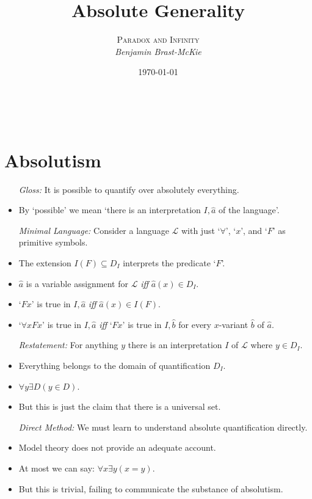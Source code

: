\documentclass[a4paper, 11pt]{article} %
\title{\textbf{Absolute Generality}} %
\author{\textsc{Paradox and Infinity}\\ \em Benjamin Brast-McKie} %
\date{\today} %
\makeatletter
\newcommand{\corner}[1]{\ulcorner#1\urcorner} %
\renewcommand{\L}{\mathcal{L}}
\renewcommand{\maketitle}{ %
\begin{flushright} %
{\LARGE\@title} %

\vspace{10pt} %

{\@author} %
\\\@date %

\vspace{-20pt} %
\end{flushright}
}
\makeatother
\begin{document}
\maketitle %

\thispagestyle{empty}


\section*{Absolutism}

\begin{itemize}
  \item[\it Gloss:] It is possible to quantify over absolutely everything.
    \item By `possible' we mean `there is an interpretation $I,{\hat{a}}$ of the language'.
  \item[\it Minimal Language:] Consider a language $\L$ with just `$\forall$', `$x$', and `$F$' as primitive symbols.
    \item The extension $I(F) \subseteq D_I$ interprets the predicate `$F$'.
    \item $\hat{a}$ is a variable assignment for $\L$ \textit{iff} $\hat{a}(x) \in D_I$.
    \item `$Fx$' is true in $I, \hat{a}$ \textit{iff} $\hat{a}(x) \in I(F)$. 
    \item `$\forall xFx$' is true in $I,{\hat{a}}$ \textit{iff} `$Fx$' is true in $I,{\hat{b}}$ for every $x$-variant $\hat{b}$ of $\hat{a}$.
  \item[\it Restatement:] For anything $y$ there is an interpretation $I$ of $\L$ where $y \in D_I$. 
    \item Everything belongs to the domain of quantification $D_I$.
    \item $\forall y\exists D(y \in D)$.
    \item But this is just the claim that there is a universal set.
  \item[\it Direct Method:] We must learn to understand absolute quantification directly.
    \item Model theory does not provide an adequate account.
    \item At most we can say: $\forall x \exists y(x =y)$.
    \item But this is trivial, failing to communicate the substance of absolutism.
\end{itemize}
\end{document}
